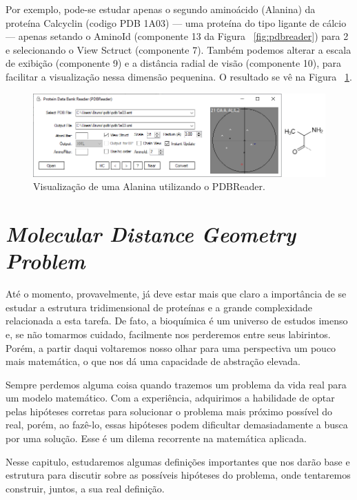 \documentclass[a4paper,12pt]{article}
\begin{document}
	Por exemplo, pode-se estudar apenas o segundo aminoácido (Alanina) da proteína Calcyclin (codigo PDB 1A03) --- uma proteína do tipo ligante de cálcio --- apenas setando o AminoId (componente 13 da Figura ~\ref{fig:pdbreader}) para 2 e selecionando o View Sctruct (componente 7). Também podemos alterar a escala de exibição (componente 9) e a distância radial de visão (componente 10), para facilitar a visualização nessa dimensão pequenina. O resultado se vê na Figura ~\ref{fig:exemploView}.
	
	\begin{figure}[H]
		\hspace{-1.3cm}
		\includegraphics[width=1.2\linewidth]{exemploView.png}
		\caption{Visualização de uma Alanina utilizando o PDBReader.}
		\label{fig:exemploView}
	\end{figure}
	
	\newpage
	\section{\textit{Molecular Distance Geometry Problem} \label{sec:dmdgp}}
	Até o momento, provavelmente, já deve estar mais que claro a importância de se estudar a estrutura tridimensional de proteínas e a grande complexidade relacionada a esta tarefa. De fato, a bioquímica é um universo de estudos imenso e, se não tomarmos cuidado, facilmente nos perderemos entre seus labirintos. Porém, a partir daqui voltaremos nosso olhar para uma perspectiva um pouco mais matemática, o que nos dá uma capacidade de abstração elevada.
	
	Sempre perdemos alguma coisa quando trazemos um problema da vida real para um modelo matemático. Com a experiência, adquirimos a habilidade de optar pelas hipóteses corretas para solucionar o problema mais próximo possível do real, porém, ao fazê-lo, essas hipóteses podem dificultar demasiadamente a busca por uma solução. Esse é um dilema recorrente na matemática aplicada.
	 
	Nesse capitulo, estudaremos algumas definições importantes que nos darão base e estrutura para discutir sobre as possíveis hipóteses do problema, onde tentaremos construir, juntos, a sua real definição.  
	
\end{document}
